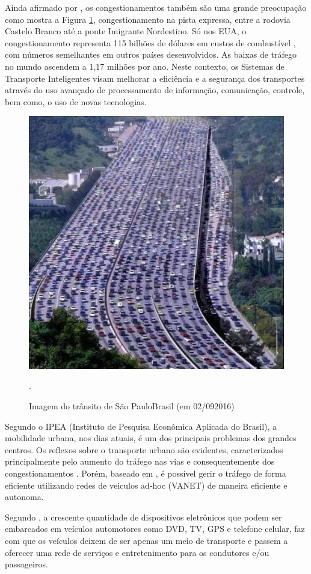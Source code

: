 \documentclass[
	12pt,				%
	oneside,			%
	a4paper,			%
	english,			%
	brazil				%
	]{abntex2ppgsi}
\begin{document}
Ainda afirmado por  , os congestionamentos também são uma grande preocupação como mostra a Figura \ref{fig:transito}, congestionamento na pista expressa, entre a rodovia Castelo Branco até a ponte Imigrante Nordestino.  Só nos EUA, o congestionamento representa 115 bilhões de dólares em custos de combustível \cite{TTI}, com números semelhantes em outros países desenvolvidos. As baixas de tráfego no mundo ascendem a 1,17 milhões por ano. Neste contexto, os Sistemas de Transporte Inteligentes visam melhorar a eficiência e a segurança dos transportes através do uso avançado de processamento de informação, comunicação, controle, bem como, o uso de novas tecnologias.

\begin{figure}[h!]
	\centering
	\includegraphics[width=0.7\columnwidth]{images/transito2.jpeg}
	\caption{Imagem do trânsito de São Paulo\-Brasil (em 02/092016) \cite{autoentusiastasclassic}}.
	\label{fig:transito}
\end{figure}


Segundo o IPEA (Instituto de Pesquisa Econômica Aplicada do Brasil), a mobilidade urbana, nos dias atuais, é um dos principais problemas dos grandes centros. Os reflexos sobre o transporte urbano são evidentes, caracterizados principalmente pelo aumento do tráfego nas vias e consequentemente dos congestionamentos \cite{carvalho2010mobilidade}. Porém, baseado em  , é possível gerir o tráfego de forma eficiente utilizando redes de veiculos ad-hoc (VANET) de maneira eficiente e autonoma.

Segundo  , a crescente quantidade de dispositivos eletrônicos que podem ser embarcados em veículos automotores como DVD, TV, GPS e telefone celular, faz com que os veículos deixem de ser apenas um meio de transporte e passem a oferecer uma rede de serviços e entretenimento para os condutores e/ou passageiros.
\end{document}
